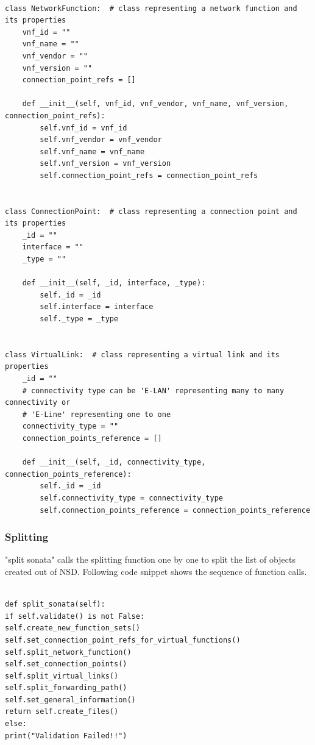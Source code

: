 \begin{lstlisting}[caption=Python Base classes, label=lis:schemaclasses]

class NetworkFunction:  # class representing a network function and its properties
    vnf_id = ""
    vnf_name = ""
    vnf_vendor = ""
    vnf_version = ""
    connection_point_refs = []

    def __init__(self, vnf_id, vnf_vendor, vnf_name, vnf_version, connection_point_refs):
        self.vnf_id = vnf_id
        self.vnf_vendor = vnf_vendor
        self.vnf_name = vnf_name
        self.vnf_version = vnf_version
        self.connection_point_refs = connection_point_refs


class ConnectionPoint:  # class representing a connection point and its properties
    _id = ""
    interface = ""
    _type = ""

    def __init__(self, _id, interface, _type):
        self._id = _id
        self.interface = interface
        self._type = _type


class VirtualLink:  # class representing a virtual link and its properties
    _id = ""
    # connectivity type can be 'E-LAN' representing many to many connectivity or
    # 'E-Line' representing one to one
    connectivity_type = ""
    connection_points_reference = []

    def __init__(self, _id, connectivity_type, connection_points_reference):
        self._id = _id
        self.connectivity_type = connectivity_type
        self.connection_points_reference = connection_points_reference

\end{lstlisting}

\subsubsection{Splitting} "split sonata" calls the splitting function one by one to split the list of objects created out of NSD. Following code snippet shows the sequence of function calls.

\begin{lstlisting}[caption=Sequence of function calls, label=lis:functioncalls]

def split_sonata(self):
if self.validate() is not False:
self.create_new_function_sets()
self.set_connection_point_refs_for_virtual_functions()
self.split_network_function()
self.set_connection_points()
self.split_virtual_links()
self.split_forwarding_path()
self.set_general_information()
return self.create_files()
else:
print("Validation Failed!!")

\end{lstlisting}

